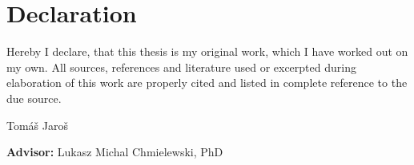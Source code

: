 \chapter*{Declaration}

\noindent
Hereby I declare, that this thesis is my original work, which I
have worked out on my own. All sources, references and literature used or
excerpted during elaboration of this work are properly cited and listed in
complete reference to the due source.

\vspace{1cm}
\begin{flushright}
    Tomáš Jaroš
\end{flushright}
\vfill
\textbf{Advisor:} Lukasz Michal Chmielewski, PhD
